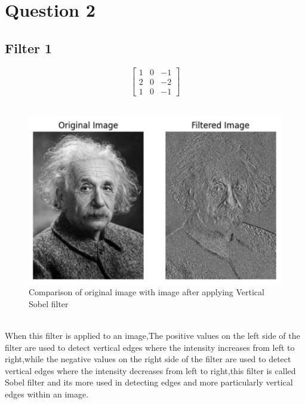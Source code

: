 \documentclass{assignment}
\begin{document}
\section*{Question 2}
\subsection{Filter 1}
\[
\begin{bmatrix} 1 & 0 & -1 \\ 2 & 0 & -2 \\ 1 & 0 & -1 \end{bmatrix}
\]
\\
\begin{figure}[h]
    \centering
    \includegraphics[width=0.5\linewidth]{2_1.png}
    \caption{Comparison of original image with image after applying Vertical Sobel filter}
    \label{fig:enter-label}
\end{figure}
\\
When this filter is applied to an image,The positive values on the left side of the filter are used to detect vertical edges where the intensity increases from left to right,while the negative values on the right side of the filter are used to detect vertical edges where the intensity decreases from left to right,this filter is called Sobel filter and its more used in detecting edges and more particularly vertical edges within an image.
\end{document}
